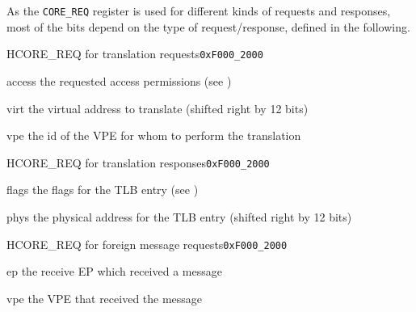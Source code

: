 \noindent As the \texttt{CORE\_REQ} register is used for different kinds of requests and responses,
most of the bits depend on the type of request/response, defined in the following.

\begin{register}{H}{CORE\_REQ for translation requests}{\texttt{0xF000\_2000}}
  \regnewline%
  \begin{regdesc}\begin{reglist}
    \item[access] the requested access permissions (see )
    \item[virt] the virtual address to translate (shifted right by 12 bits)
    \item[vpe] the id of the VPE for whom to perform the translation
  \end{reglist}\end{regdesc}
\end{register}

\begin{register}{H}{CORE\_REQ for translation responses}{\texttt{0xF000\_2000}}
  \regnewline%
  \begin{regdesc}\begin{reglist}
    \item[flags] the flags for the TLB entry (see )
    \item[phys] the physical address for the TLB entry (shifted right by 12 bits)
  \end{reglist}\end{regdesc}
\end{register}
\extend{}

\begin{register}{H}{CORE\_REQ for foreign message requests}{\texttt{0xF000\_2000}}
  \regnewline%
  \begin{regdesc}\begin{reglist}
    \item[ep] the receive EP which received a message
    \item[vpe] the VPE that received the message
  \end{reglist}\end{regdesc}
\end{register}

